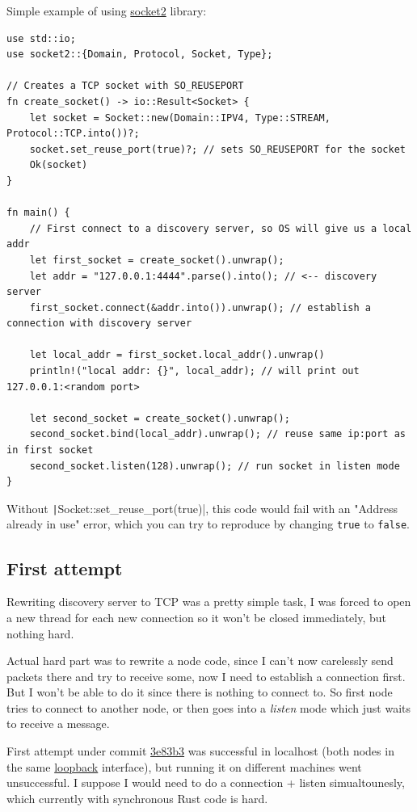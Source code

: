 \documentclass[a4paper]{article}
\begin{document}
Simple example of using \href{https://crates.io/crates/socket2}{socket2} library:
\begin{verbatim}
use std::io;
use socket2::{Domain, Protocol, Socket, Type};

// Creates a TCP socket with SO_REUSEPORT
fn create_socket() -> io::Result<Socket> {
    let socket = Socket::new(Domain::IPV4, Type::STREAM, Protocol::TCP.into())?;
    socket.set_reuse_port(true)?; // sets SO_REUSEPORT for the socket
    Ok(socket)
}

fn main() {
    // First connect to a discovery server, so OS will give us a local addr
    let first_socket = create_socket().unwrap();
    let addr = "127.0.0.1:4444".parse().into(); // <-- discovery server
    first_socket.connect(&addr.into()).unwrap(); // establish a connection with discovery server

    let local_addr = first_socket.local_addr().unwrap()
    println!("local addr: {}", local_addr); // will print out 127.0.0.1:<random port>

    let second_socket = create_socket().unwrap();
    second_socket.bind(local_addr).unwrap(); // reuse same ip:port as in first socket
    second_socket.listen(128).unwrap(); // run socket in listen mode
}
\end{verbatim}

Without \texttt|Socket::set_reuse_port(true)|, this code would fail with an
"Address already in use" error, which you can try to reproduce by changing \texttt{true} to \texttt{false}.

\subsection{First attempt}
Rewriting discovery server to TCP was a pretty simple task, I was forced to open a new thread for
each new connection so it won't be closed immediately, but nothing hard.

Actual hard part was to rewrite a node code, since I can't now carelessly send packets there and
try to receive some, now I need to establish a connection first. But I won't be able to do it since
there is nothing to connect to. So first node tries to connect to another node, or then goes into a
\emph{listen} mode which just waits to receive a message.

First attempt under commit \href{https://github.com/dankmolot/petope/tree/3e83b3}{3e83b3} was
successful in localhost (both nodes in the same \href{https://en.wikipedia.org/wiki/Loopback}{loopback} interface),
but running it on different machines went unsuccessful. I suppose I would need to do a connection + listen
simualtounesly, which currently with synchronous Rust code is hard.
\end{document}
